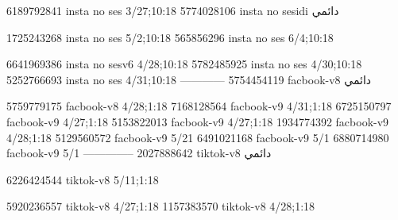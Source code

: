 
6189792841 insta no ses
3/27;10:18
5774028106 insta no sesidi
دائمي


1725243268 insta no ses
5/2;10:18
565856296 insta no ses
6/4;10:18

6641969386 insta no sesv6
4/28;10:18
5782485925 insta no ses
4/30;10:18
5252766693 insta no ses
4/31;10:18
------------
5754454119 facbook-v8
دائمي

5759779175 facbook-v8
4/28;1:18
7168128564 facbook-v9
4/31;1:18
6725150797 facbook-v9
4/27;1:18
5153822013 facbook-v9
4/27;1:18
1934774392 facbook-v9
4/28;1:18
5129560572 facbook-v9
5/21
6491021168 facbook-v9
5/1
6880714980 facbook-v9
5/1
--------------
2027888642 tiktok-v8
دائمي

6226424544 tiktok-v8
5/11;1:18

5920236557 tiktok-v8
4/27;1:18
1157383570 tiktok-v8
4/28;1:18
